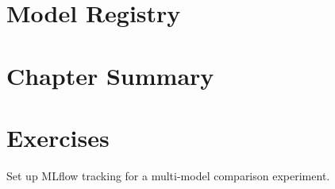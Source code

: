 \section{Model Registry}


\section{Chapter Summary}


\section{Exercises}

\begin{exercise}
Set up MLflow tracking for a multi-model comparison experiment.
\end{exercise}
